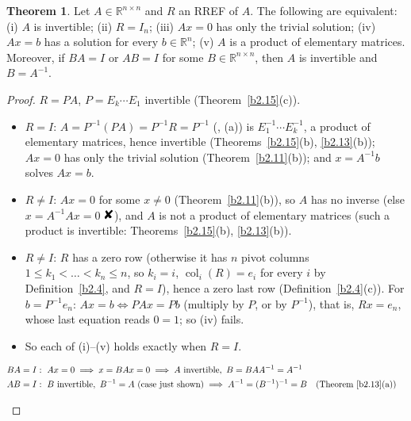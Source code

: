 \documentclass[12pt]{article}
\newcommand{\R}{\mathbb R}
\newcommand{\contradiction}{\mathord{\text{\large\ding{56}}}}
\DeclareMathOperator{\col}{col}
\theoremstyle{definition}
\newtheorem{theorem}{Theorem}
\newcommand{\boardtop}{\vspace*{-\abovedisplayskip}}
\begin{document}
\begin{theorem}\label{b2.16}
Let \(A\in\R^{n\times n}\) and \(R\) an RREF of \(A\). The following are equivalent:
(i) \(A\) is invertible; (ii) \(R=I_n\); (iii) \(Ax=0\) has only the trivial solution; (iv) \(Ax=b\) has a solution
for every \(b\in\R^n\); (v) \(A\) is a product of elementary matrices. Moreover, if \(BA=I\) or \(AB=I\) for some
\(B\in\R^{n\times n}\), then \(A\) is invertible and \(B=A^{-1}\).
\end{theorem}
\begin{proof}
\(R=PA\), \(P=E_k\cdots E_1\) invertible (Theorem~\ref{b2.15}(c)).
\begin{itemize}
\item \(R=I\): \(A=P^{-1}(PA)=P^{-1}R=P^{-1}\) (, (a)) is \(E_1^{-1}\cdots E_k^{-1}\), a product of elementary matrices, hence invertible
(Theorems~\ref{b2.15}(b), \ref{b2.13}(b)); \(Ax=0\) has only the trivial solution (Theorem~\ref{b2.11}(b)); and
\(x=A^{-1}b\) solves \(Ax=b\).
\item \(R\ne I\): \(Ax=0\) for some \(x\ne0\) (Theorem~\ref{b2.11}(b)), so \(A\) has no inverse (else
\(x=A^{-1}Ax=0\) \(\contradiction\)), and \(A\) is not a product of elementary matrices (such a product is invertible: Theorems~\ref{b2.15}(b),
\ref{b2.13}(b)).
\item \(R\ne I\): \(R\) has a zero row (otherwise it has \(n\) pivot columns
\(1\leqslant k_1<\dots<k_n\leqslant n\), so \(k_i=i\), \(\col_i(R)=e_i\) for every \(i\) by Definition~\ref{b2.4},
and \(R=I\)), hence a zero last row (Definition~\ref{b2.4}(c)).
For \(b=P^{-1}e_n\): \(Ax=b\iff PAx=Pb\) (multiply by \(P\), or by \(P^{-1}\)), that is, \(Rx=e_n\), whose last
equation reads \(0=1\); so (iv) fails.
\item So each of (i)--(v) holds exactly when \(R=I\).
\end{itemize}
\begin{board}
\boardtop
\begin{align*}
BA=I&:\ Ax=0\implies x=BAx=0\implies A\text{ invertible},\ B=BAA^{-1}=A^{-1}\\
AB=I&:\ B\text{ invertible},\ B^{-1}=A\ \text{(case just shown)}\implies A^{-1}=(B^{-1})^{-1}=B
&&\text{(Theorem~\ref{b2.13}(a))}
\end{align*}
\end{board}
\nopagebreak
\end{proof}
\end{document}
